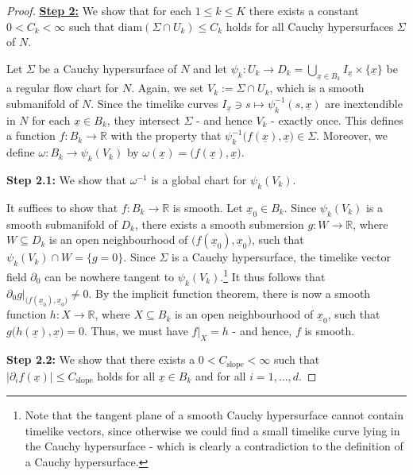 \documentclass[reqno]{article}
\newcommand{\R}{\mathbb{R}}
\newcommand{\diam}{\mathrm{diam}}
\newcommand{\ux}{\underline{x}}
\begin{document}
\begin{proof}
\underline{\textbf{Step 2:}} We show that for each $1 \leq k \leq K$ there exists a constant $0 < C_k < \infty$ such that $\diam(\Sigma \cap U_k) \leq C_k$ holds for all Cauchy hypersurfaces $\Sigma$ of $N$.
\vspace*{2mm}


Let $\Sigma$ be a Cauchy hypersurface of $N$ and let $\psi_k : U_k \to D_k = \bigcup_{\ux \in B_k} I_{\ux} \times \{\ux\}$ be a regular flow chart for $N$. Again, we set $V_k := \Sigma \cap U_k$, which is a smooth submanifold of $N$. Since the timelike curves $I_{\ux} \ni s \mapsto \psi_k^{-1}(s ,\ux)$ are inextendible in $N$ for each $\ux \in B_k$, they intersect $\Sigma$ - and hence $V_k$ - exactly once. This defines a function $f : B_k \to \R$ with the property that $\psi_k^{-1}\big(f(\ux), \ux\big) \in \Sigma$.  Moreover, we define $\omega : B_k \to \psi_k(V_k)$ by $\omega(\ux) = \big( f(\ux), \ux\big)$.
\vspace*{2mm}

\textbf{Step 2.1:} We show that $\omega^{-1}$ is a global chart for $\psi_k(V_k)$.
\vspace*{2mm}

It suffices to show that $f : B_k \to \R$ is smooth.
Let $\ux_0 \in B_k$. Since $\psi_k(V_k)$ is a smooth submanifold of $D_k$, there exists a smooth submersion $g : W \to \R$, where $W \subseteq D_k$ is an open neighbourhood of $\big(f(\ux_0), \ux_0\big)$, such that $\psi_k(V_k) \cap W = \{ g=0\}$. Since $\Sigma$ is a Cauchy hypersurface, the timelike vector field $\partial_0$ can be nowhere tangent to $\psi_k(V_k)$.\footnote{\label{TangentSpace}Note that the tangent plane of a smooth Cauchy hypersurface cannot contain timelike vectors, since otherwise we could find a small timelike curve lying in the Cauchy hypersurface - which is clearly a contradiction to the definition of a Cauchy hypersurface.} It thus follows that $\partial_0 g|_{\big(f(\ux_0), \ux_0\big)} \neq 0$. By the implicit function theorem, there is now a smooth function $h : X \to \R$, where $X \subseteq B_k$ is an open neighbourhood of $\ux_0$, such that $g\big(h(\ux),\ux\big) =0$. Thus, we must have $f|_X = h$ - and hence, $f$ is smooth.
\vspace*{2mm}

\textbf{Step 2.2:} We show that there exists a $0< C_\mathrm{slope} < \infty$ such that $|\partial_i f(\ux)| \leq C_\mathrm{slope} $ holds for all $\ux \in B_k$  and for all $i = 1, \ldots, d$.
\vspace*{2mm}


\end{proof}
\end{document}
